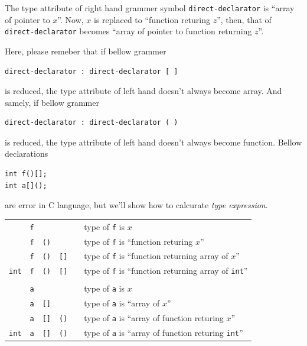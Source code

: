 The type attribute of right hand grammer symbol {\tt{direct-declarator}}
is ``array of pointer to $x$''.
Now, $x$ is replaced to ``function returing $z$'',
then, that of {\tt{direct-declarator}} becomes
``array of pointer to function returning $z$''.

Here, please remeber that if bellow grammer
\begin{verbatim}
direct-declarator : direct-declarator [ ]
\end{verbatim}
is reduced, the type attribute of left hand doesn't always become
array. And samely, if bellow grammer
\begin{verbatim}
direct-declarator : direct-declarator ( )
\end{verbatim}
is reduced, the type attribute of left hand doesn't always become
function.
Bellow declarations
\begin{verbatim}
int f()[];
int a[]();
\end{verbatim}
are error in C language, but we'll show how to calcurate
{\em type expression}. 

\begin{tabular}{cccccl}
           & {\tt{f}} &           &           &    &
                 type of {\tt{f}} is $x$                       \\
           & {\tt{f}} & {\tt{()}} &           &    &
                 type of {\tt{f}} is ``function returing $x$'' \\
           & {\tt{f}} & {\tt{()}} & {\tt{[]}} &    &
                 type of {\tt{f}} is ``function returning array of $x$'' \\
{\tt{int}} & {\tt{f}} & {\tt{()}} & {\tt{[]}} &    &
            type of {\tt{f}} is ``function returning array of {\tt{int}}'' \\
           &          &           &           &    &
                                                         \\
           & {\tt{a}} &           &           &    &
                 type of {\tt{a}} is $x$                       \\
           & {\tt{a}} & {\tt{[]}} &           &    &
                 type of {\tt{a}} is ``array of $x$'' \\
           & {\tt{a}} & {\tt{[]}} & {\tt{()}} &    &
            type of {\tt{a}} is ``array of function returing $x$'' \\
{\tt{int}} & {\tt{a}} & {\tt{[]}} & {\tt{()}} &    &
            type of {\tt{a}} is ``array of function returing {\tt{int}}'' \\
\end{tabular}

